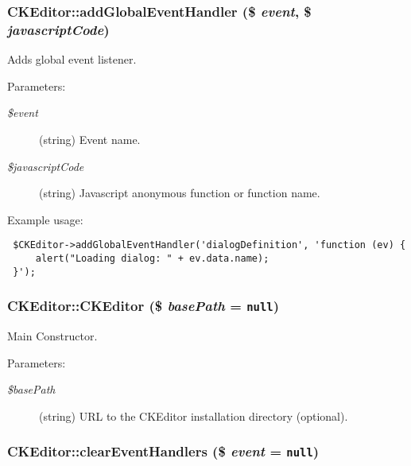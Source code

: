  \hypertarget{classCKEditor_3bc88e349a30e84ddbdee5d55950ddb1}{
\subsubsection[{addGlobalEventHandler}]{\setlength{\rightskip}{0pt plus 5cm}CKEditor::addGlobalEventHandler (\$ {\em event}, \/  \$ {\em javascriptCode})}}
\label{classCKEditor_3bc88e349a30e84ddbdee5d55950ddb1}


Adds global event listener.

\begin{Desc}
\item[Parameters:]
\begin{description}
\item[{\em \$event}](string) Event name. \item[{\em \$javascriptCode}](string) Javascript anonymous function or function name.\end{description}
\end{Desc}
Example usage: 

\begin{Code}\begin{verbatim} $CKEditor->addGlobalEventHandler('dialogDefinition', 'function (ev) {
     alert("Loading dialog: " + ev.data.name);
 }');
\end{verbatim}
\end{Code}

 \hypertarget{classCKEditor_17bed5f81d2db60032f0b384a9b4e237}{
\subsubsection[{CKEditor}]{\setlength{\rightskip}{0pt plus 5cm}CKEditor::CKEditor (\$ {\em basePath} = {\tt null})}}
\label{classCKEditor_17bed5f81d2db60032f0b384a9b4e237}


Main Constructor.

\begin{Desc}
\item[Parameters:]
\begin{description}
\item[{\em \$basePath}](string) URL to the CKEditor installation directory (optional). \end{description}
\end{Desc}
\hypertarget{classCKEditor_1b92304a2eef124810dd2be4f30e18f9}{
\subsubsection[{clearEventHandlers}]{\setlength{\rightskip}{0pt plus 5cm}CKEditor::clearEventHandlers (\$ {\em event} = {\tt null})}}
\label{classCKEditor_1b92304a2eef124810dd2be4f30e18f9}


